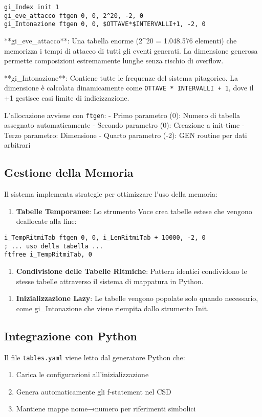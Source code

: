 \begin{lstlisting}[language=Csound]
gi_Index init 1
gi_eve_attacco ftgen 0, 0, 2^20, -2, 0
gi_Intonazione ftgen 0, 0, $OTTAVE*$INTERVALLI+1, -2, 0
\end{lstlisting}

**gi_eve_attacco**: Una tabella enorme (2^20 = 1.048.576 elementi) che memorizza i tempi di attacco di tutti gli eventi generati. La dimensione generosa permette composizioni estremamente lunghe senza rischio di overflow.

**gi_Intonazione**: Contiene tutte le frequenze del sistema pitagorico. La dimensione è calcolata dinamicamente come \texttt{OTTAVE * INTERVALLI + 1}, dove il +1 gestisce casi limite di indicizzazione.

L'allocazione avviene con \texttt{ftgen}:
- Primo parametro (0): Numero di tabella assegnato automaticamente
- Secondo parametro (0): Creazione a init-time
- Terzo parametro: Dimensione
- Quarto parametro (-2): GEN routine per dati arbitrari
\subsection{Gestione della Memoria}
Il sistema implementa strategie per ottimizzare l'uso della memoria:

\begin{enumerate}
    \item \textbf{Tabelle Temporanee}: Lo strumento Voce crea tabelle estese che vengono deallocate alla fine:
\end{enumerate}
\begin{lstlisting}[language=Csound]
i_TempRitmiTab ftgen 0, 0, i_LenRitmiTab + 10000, -2, 0
; ... uso della tabella ...
ftfree i_TempRitmiTab, 0
\end{lstlisting}

\begin{enumerate}
    \item \textbf{Condivisione delle Tabelle Ritmiche}: Pattern identici condividono le stesse tabelle attraverso il sistema di mappatura in Python.
\end{enumerate}

\begin{enumerate}
    \item \textbf{Inizializzazione Lazy}: Le tabelle vengono popolate solo quando necessario, come gi_Intonazione che viene riempita dallo strumento Init.
\end{enumerate}
\subsection{Integrazione con Python}
Il file \texttt{tables.yaml} viene letto dal generatore Python che:
\begin{enumerate}
    \item Carica le configurazioni all'inizializzazione
    \item Genera automaticamente gli f-statement nel CSD
    \item Mantiene mappe nome→numero per riferimenti simbolici
\end{enumerate}

